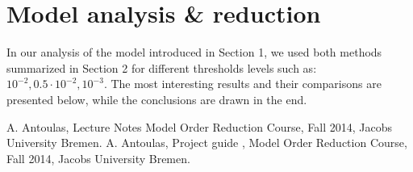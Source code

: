 \documentclass[10pt,a4paper]{article}
\begin{document}
\section{Model analysis \& reduction}
In our analysis of the model introduced in Section 1, we used both methods summarized in Section 2 for different thresholds levels such as: $10^{-2}, 0.5\cdot10^{-2}, 10^{-3}$. The most interesting results and their comparisons are presented below, while the conclusions are drawn in the end.

\begin{thebibliography}{3}
 A. Antoulas, Lecture Notes Model Order Reduction Course, Fall 2014, Jacobs University Bremen.
 A. Antoulas, Project guide , Model Order Reduction Course, Fall 2014, Jacobs University Bremen.
\end{thebibliography}
\end{document}
